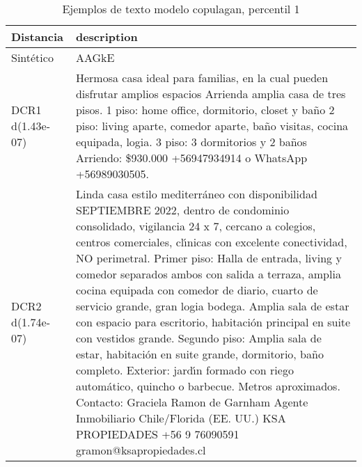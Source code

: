 \begin{table}[H]
\centering
\fontsize{10}{14}\selectfont
\caption{Ejemplos de texto modelo copulagan, percentil 1}
\label{table-example-economicos-a-2-copulagan-1p-text}
\begin{tabular}{|l|m{35em}|}
\hline
\rowcolor[gray]{0.8}
Distancia & description \\
\hline Sintético & AAGkE \\
\hline DCR1 d(1.43e-07) & Hermosa casa ideal para familias, en la cual pueden disfrutar amplios espacios Arrienda amplia casa de tres pisos. 1 piso: home office, dormitorio, closet y ba\~no 2 piso: living aparte, comedor aparte, ba\~no visitas, cocina equipada, logia. 3 piso: 3 dormitorios y 2 ba\~nos Arriendo: \$930.000 +56947934914 o WhatsApp +56989030505. \\
\hline DCR2 d(1.74e-07) & Linda casa estilo mediterr\'aneo con disponibilidad SEPTIEMBRE 2022, dentro de condominio consolidado, vigilancia 24 x 7, cercano a colegios, centros comerciales, cl{\'\i}nicas con excelente conectividad, NO perimetral. Primer piso: Halla de entrada, living y comedor separados ambos con salida a terraza, amplia cocina equipada con comedor de diario, cuarto de servicio grande, gran logia bodega. Amplia sala de estar con espacio para escritorio, habitaci\'on principal en suite con vestidos grande. Segundo piso: Amplia sala de estar, habitaci\'on en suite grande, dormitorio, ba\~no completo. Exterior: jard{\'\i}n formado con riego autom\'atico, quincho o barbecue. Metros aproximados.  Contacto: Graciela Ramon de Garnham Agente Inmobiliario Chile/Florida (EE. UU.) KSA PROPIEDADES +56 9 76090591 gramon@ksapropiedades.cl \\
\hline
\end{tabular}
\end{table}
